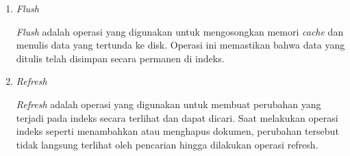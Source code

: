 \begin{enumerate}
    \item \textit{Flush}
    
    \textit{Flush} adalah operasi yang digunakan untuk mengosongkan memori \textit{cache} dan menulis data yang tertunda ke disk. Operasi ini memastikan bahwa data yang ditulis telah disimpan secara permanen di indeks.
    
    \item \textit{Refresh}
    
    \textit{Refresh} adalah operasi yang digunakan untuk membuat perubahan yang terjadi pada indeks secara terlihat dan dapat dicari. Saat melakukan operasi indeks seperti menambahkan atau menghapus dokumen, perubahan tersebut tidak langsung terlihat oleh pencarian hingga dilakukan operasi refresh.
\end{enumerate}